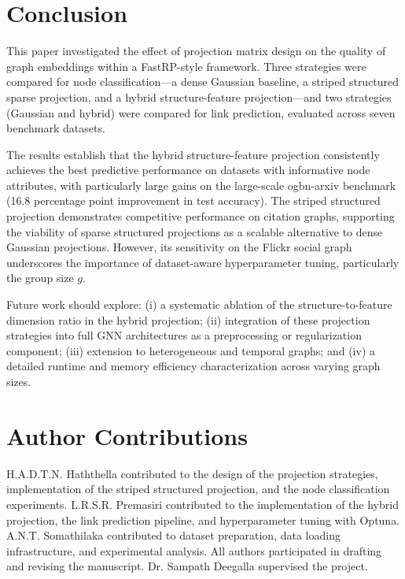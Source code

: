 \documentclass[conference]{IEEEtran}
\begin{document}
\section{Conclusion}
\label{sec:conclusion}

This paper investigated the effect of projection matrix design on the
quality of graph embeddings within a FastRP-style framework. Three
strategies were compared for node classification---a dense Gaussian baseline,
a striped structured sparse projection, and a hybrid structure-feature
projection---and two strategies (Gaussian and hybrid) were compared for
link prediction, evaluated across seven benchmark datasets.

The results establish that the hybrid structure-feature projection
consistently achieves the best predictive performance on datasets with
informative node attributes, with particularly large gains on the
large-scale ogbn-arxiv benchmark (16.8 percentage point improvement in
test accuracy). The striped structured projection demonstrates competitive
performance on citation graphs, supporting the viability of sparse
structured projections as a scalable alternative to dense Gaussian
projections. However, its sensitivity on the Flickr social graph
underscores the importance of dataset-aware hyperparameter tuning,
particularly the group size $g$.

Future work should explore: (i) a systematic ablation of the
structure-to-feature dimension ratio in the hybrid projection; (ii)
integration of these projection strategies into full GNN architectures as
a preprocessing or regularization component; (iii) extension to
heterogeneous and temporal graphs; and (iv) a detailed runtime and memory
efficiency characterization across varying graph sizes.

\section*{Author Contributions}

H.A.D.T.N. Haththella contributed to the design of the projection
strategies, implementation of the striped structured projection, and the
node classification experiments.
L.R.S.R. Premasiri contributed to the implementation of the hybrid
projection, the link prediction pipeline, and hyperparameter tuning with
Optuna.
A.N.T. Somathilaka contributed to dataset preparation, data loading
infrastructure, and experimental analysis.
All authors participated in drafting and revising the manuscript.
Dr. Sampath Deegalla supervised the project.




\end{document}
